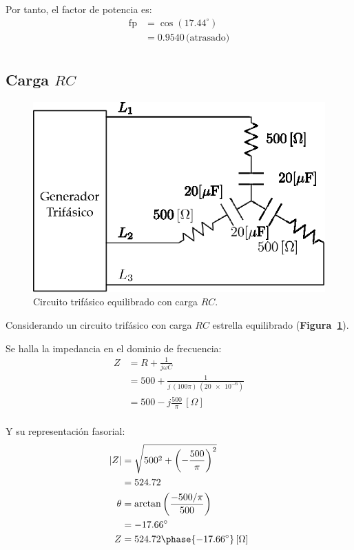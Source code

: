\documentclass[letter,11pt]{article}
\begin{document}
Por tanto, el factor de potencia es:
\begin{equation*}
    \begin{split}
        \text{fp} &= \cos(17.44^{\circ})\\
                  &= 0.9540\,\text{(atrasado)}\\
    \end{split}
\end{equation*}

\subsection{Carga $RC$}
\begin{figure}[!h]
\centering
\includegraphics[scale=0.95]{figura2.eps}
\caption{Circuito trifásico equilibrado con carga $RC$.}
\label{circuito2}
\end{figure}

Considerando un circuito trifásico con carga $RC$ estrella equilibrado
(\textbf{Figura~\ref{circuito2}}).

Se halla la impedancia en el dominio de frecuencia:
\begin{equation*}
    \begin{split}
        Z &= R+\frac{1}{j\omega C}\\
          &= 500+\frac{1}{j\,(100\pi)\,(\num{20e-6})}\\
          &= 500-j\frac{500}{\pi}\,[\Omega]\\
    \end{split}
\end{equation*}

Y su representación fasorial:
\begin{equation*}
    \begin{split}
        |Z| &= \sqrt{500^2+\left(-\frac{500}{\pi}\right)^2}\\
            &= 524.72\\
        \theta &= \arctan\left(\frac{-500/\pi}{500}\right)\\
               &= -17.66^{\circ}\\
        Z &= 524.72\phase{-17.66^{\circ}}\,[\Omega]\\
    \end{split}
\end{equation*}
\end{document}
